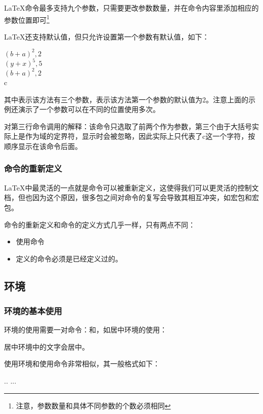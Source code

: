     \LaTeX{}命令最多支持九个参数，只需要更改参数数量，并在命令内容里添加相应的参数位置即可\footnote{注意，参数数量和具体不同参数的个数必须相同}
    
    \LaTeX{}还支持默认值，但只允许设置第一个参数有默认值，如下：
    \begin{texshow}
        \newcommand{\eqs}[3][2]{$(#3+#2)^#1,#1$\\}
        \eqs{a}{b}
        \eqs[5]{x}{y}
        \eqs{a}{b}{c}
    \end{texshow}
    其中\highunderline{[3]}表示该方法有三个参数，\highunderline{[2]}表示该方法第一个参数的默认值为2。注意上面的示例还演示了一个参数可以在不同的位置使用多次。

    对第三行命令调用的解释：该命令只选取了前两个作为参数，第三个由于大括号实际上是作为域的定界符，显示时会被忽略，因此实际上只代表了c这一个字符，按顺序显示在该命令后面。

    \subsubsection{命令的重新定义}\label{subsub:renewcomm}
    \LaTeX{}中最灵活的一点就是命令可以被重新定义，这使得我们可以更灵活的控制文档，但也因为这个原因，很多包之间对命令的复写会导致其相互冲突，如宏包和宏包。

    命令的重新定义和命令的定义方式几乎一样，只有两点不同：
    \begin{itemize}
        \item 使用命令
        \item 定义的命令必须是已经定义过的。
    \end{itemize}

    \subsection{环境}
    \subsubsection{环境的基本使用}
    环境的使用需要一对命令：和，如居中环境的使用：
    \begin{texshow}
        \begin{center}
            居中环境中的文字会居中。
        \end{center}
    \end{texshow}
    使用环境和使用命令非常相似，其一般格式如下：
    \begin{texcode}
        \begin{envi}[]{}{}..{}
            ...
        \end{envi}
    \end{texcode}

